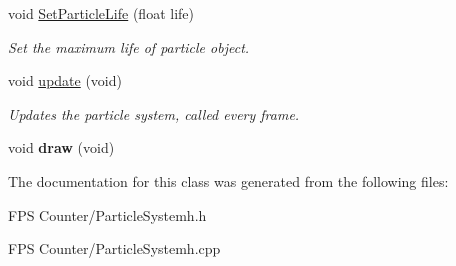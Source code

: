 \begin{DoxyCompactItemize}
\mbox{\label{class_particlesystem_ad5434b31db421a80b5d5a4f385aedc02}} 
void \mbox{\hyperlink{class_particlesystem_ad5434b31db421a80b5d5a4f385aedc02}{Set\+Particle\+Life}} (float life)
\begin{DoxyCompactList}\small\item\em Set the maximum life of particle object. \end{DoxyCompactList}\item 
\mbox{\label{class_particlesystem_ae8ba8b205313d289d3104556fc671f42}} 
void \mbox{\hyperlink{class_particlesystem_ae8ba8b205313d289d3104556fc671f42}{update}} (void)
\begin{DoxyCompactList}\small\item\em Updates the particle system, called every frame. \end{DoxyCompactList}\item 
\mbox{\label{class_particlesystem_ab483ce19ea6bfd24408de8f325459732}} 
void {\bfseries draw} (void)
\end{DoxyCompactItemize}


The documentation for this class was generated from the following files\+:\begin{DoxyCompactItemize}
\item 
F\+P\+S Counter/Particle\+Systemh.\+h\item 
F\+P\+S Counter/Particle\+Systemh.\+cpp\end{DoxyCompactItemize}
